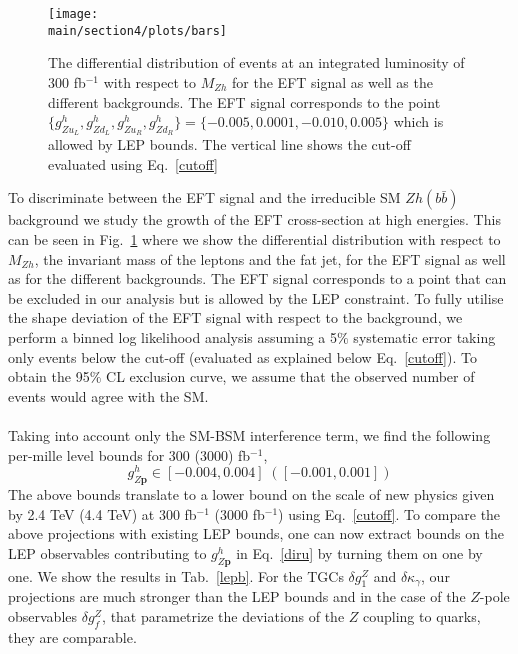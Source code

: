 \begin{figure}[!t]\centering
\texttt{[image: \\main/section4/plots/bars]}
\caption{The differential distribution of events at an integrated luminosity of 300 fb$^{-1}$ with respect to $M_{Zh}$ for the EFT signal as well as the different backgrounds. The EFT signal corresponds to the point $\{{g}^h_{Zu_L} ,{g}^h_{Zd_L} ,{g}^h_{Zu_R} ,{g}^h_{Zd_R} \}=\{-0.005, 0.0001 , -0.010, 0.005 \}$ which is allowed by  LEP bounds. The vertical line shows the cut-off evaluated using Eq.~\ref{cutoff}}
\label{bars}
\end{figure}

To discriminate between the EFT signal and the irreducible SM $Zh(b\bar b)$ background we study  the 
growth of the EFT cross-section at high energies. This can be seen in Fig.~\ref{bars}  where we show the differential distribution with respect to $M_{Zh}$, the invariant mass of the leptons and the fat jet, for the EFT signal as well as for the different backgrounds. The EFT signal corresponds to a point that can be excluded in our analysis but is allowed by the LEP constraint.  To fully utilise the shape deviation of the EFT signal with respect to the background, 
we perform a binned log likelihood analysis assuming a 5$\%$ systematic error taking only events below the cut-off (evaluated as explained below Eq.~\ref{cutoff}). To obtain the   95$\%$ CL exclusion curve, we assume that 
the observed number of events would agree with the SM. \\ \\

Taking into account only the SM-BSM interference term, we find the following per-mille level bounds for 300 (3000) fb$^{-1}$, 
\begin{equation}
g^h_{Z\textbf{p}} \in  \left[-0.004,0.004\right] \; (\left[-0.001,0.001\right])
\label{obo}
\end{equation}
The above bounds    translate to a lower bound on the scale of new physics given by 2.4 TeV (4.4 TeV) at 300 fb$^{-1}$ (3000 fb$^{-1}$) using Eq.~\ref{cutoff}.  To compare the above projections with existing LEP bounds, one can now extract bounds on the LEP observables contributing to $g^h_{Z\textbf{p}}$ in Eq.~\ref{diru} by turning them  on one by one. We show the results  in Tab.~\ref{lepb}. For the TGCs $\delta g^Z_1$ and $\delta \kappa_\gamma$, our projections are much stronger than the LEP bounds and  in the case of the $Z$-pole observables $\delta g^Z_f$, that parametrize the deviations of the $Z$ coupling to quarks, they are comparable. 

